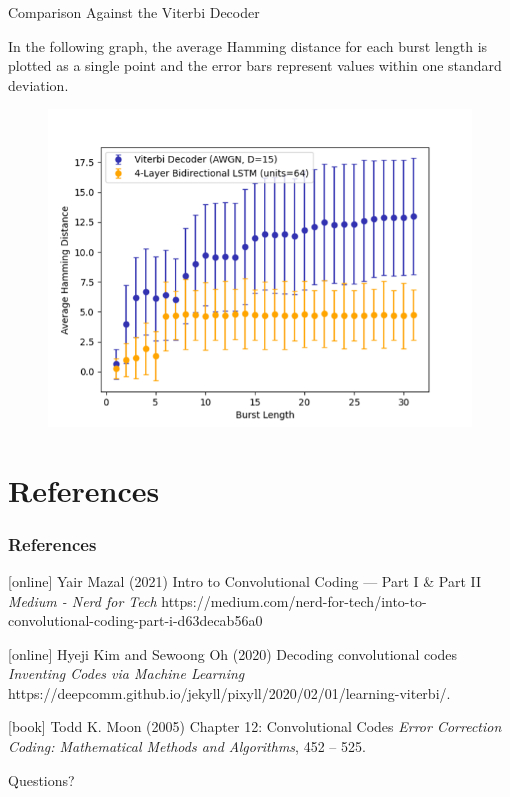 \documentclass{beamer}
\newcommand{\<}				{\langle}
\renewcommand{\>}      		{\rangle}
\begin{document}

\begin{frame}{Comparison Against the Viterbi Decoder}

In the following graph, the average Hamming distance for each burst length is plotted as a single point and the error bars represent values within one standard deviation. 

\begin{figure}[h]
\includegraphics[scale=0.5]{results_graph.png}
\end{figure}

\end{frame}

\section{References}

\begin{frame}
\frametitle{References}
\footnotesize{
\begin{thebibliography}{9} 

[online]
 Yair Mazal (2021)
\newblock Intro to Convolutional Coding — Part I & Part II
\newblock \emph{Medium - Nerd for Tech} https://medium.com/nerd-for-tech/into-to-convolutional-coding-part-i-d63decab56a0

[online]
 Hyeji Kim and Sewoong Oh (2020)
\newblock Decoding convolutional codes
\newblock \emph{Inventing Codes via Machine Learning} https://deepcomm.github.io/jekyll/pixyll/2020/02/01/learning-viterbi/.

[book]
 Todd K. Moon (2005)
\newblock Chapter 12: Convolutional Codes
\newblock \emph{Error Correction Coding: Mathematical Methods and Algorithms}, 452 -- 525.

\end{thebibliography}
}
\end{frame}


\begin{frame}
\Huge{\centerline{Questions?}}
\end{frame}

\end{document}
